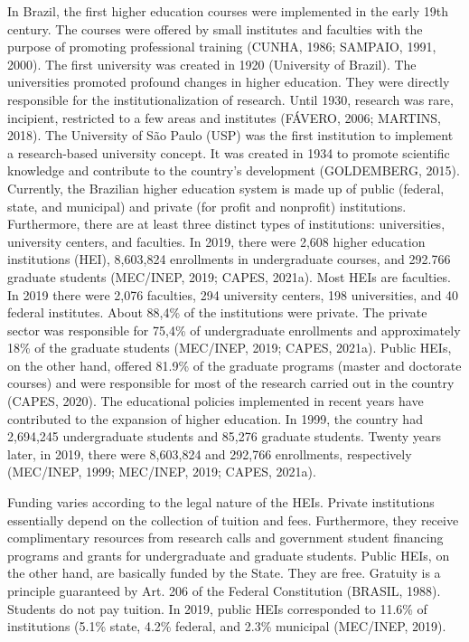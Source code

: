In Brazil, the first higher education courses were implemented in the early 19th century. The courses were offered by small institutes and faculties with the purpose of promoting professional training (CUNHA, 1986; SAMPAIO, 1991, 2000). The first university was created in 1920 (University of Brazil). The universities promoted profound changes in higher education. They were directly responsible for the institutionalization of research. Until 1930, research was rare, incipient, restricted to a few areas and institutes (FÁVERO, 2006; MARTINS, 2018). The University of São Paulo (USP) was the first institution to implement a research-based university concept. It was created in 1934 to promote scientific knowledge and contribute to the country's development (GOLDEMBERG, 2015). Currently, the Brazilian higher education system is made up of public (federal, state, and municipal) and private (for profit  and nonprofit) institutions. Furthermore, there are at least three distinct types of institutions: universities, university centers, and faculties. In 2019, there were 2,608 higher education institutions (HEI), 8,603,824 enrollments in undergraduate courses, and 292.766 graduate students (MEC/INEP, 2019; CAPES, 2021a). Most HEIs are faculties. In 2019 there were 2,076 faculties, 294 university centers, 198 universities, and 40 federal institutes. About 88,4\% of the institutions were private. The private sector was responsible for 75,4\% 	of undergraduate enrollments and approximately 18\% of the graduate students (MEC/INEP, 2019; CAPES, 2021a). Public HEIs, on the other hand, offered 81.9\% of the graduate programs (master and doctorate courses) and were responsible for most of the research carried out in the country (CAPES, 2020).
The educational policies implemented in recent years have contributed to the expansion of higher education. In 1999, the country had 2,694,245 undergraduate students and 85,276 graduate students. Twenty years later, in 2019, there were 8,603,824 and 292,766 enrollments, respectively (MEC/INEP, 1999; MEC/INEP, 2019; CAPES, 2021a).  

Funding varies according to the legal nature of the HEIs. Private institutions essentially depend on the collection of tuition and fees. Furthermore, they receive complimentary resources from research calls and government student financing programs and grants for undergraduate and graduate students. Public HEIs, on the other hand, are basically funded by the State. They are free. Gratuity is a principle guaranteed by Art. 206 of the Federal Constitution (BRASIL, 1988). Students do not pay tuition. In 2019, public HEIs corresponded to 11.6\% of institutions (5.1\% state, 4.2\% federal, and 2.3\% municipal (MEC/INEP, 2019). 



